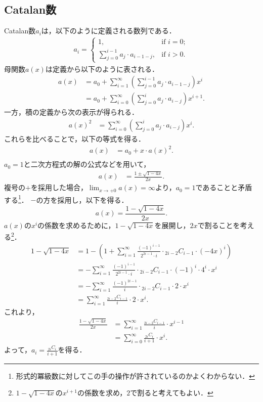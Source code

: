 \documentclass{jsarticle}
\begin{document}
\subsection{Catalan数}
Catalan数$a_i$は，以下のように定義される数列である．
\begin{align*}
  a_i = \begin{cases}
    1, & \text{if }i = 0;\\
    \displaystyle\sum_{j=0}^{i-1} a_j\cdot a_{i-1-j}, & \text{if }i > 0.
  \end{cases}
\end{align*}
母関数$a(x)$は定義から以下のように表される．
\begin{align*}
  a(x)
  &= a_0 + \sum_{i=1}^\infty \left(\sum_{j=0}^{i-1} a_j\cdot a_{i-1-j}\right) x^i\\
  &= a_0 + \sum_{i=0}^\infty \left(\sum_{j=0}^i a_j\cdot a_{i-j}\right) x^{i+1}.
\end{align*}
一方，積の定義から次の表示が得られる．
\begin{align*}
  a(x)^2
  &= \sum_{i=0}^\infty \left(\sum_{j=0}^i a_j\cdot a_{i-j}\right) x^i.
\end{align*}
これらを比べることで，以下の等式を得る．
\begin{align*}
  a(x) &= a_0 + x\cdot a(x)^2.\\
\end{align*}
$a_0 = 1$と二次方程式の解の公式などを用いて，
\begin{align*}
  a(x) &= \frac{1\pm\sqrt{1-4x}}{2x}.
\end{align*}
複号の$+$を採用した場合，$\lim_{x\to+0}a(x)=\infty$より，$a_0=1$であることと矛盾する\footnote{形式的冪級数に対してこの手の操作が許されているのかよくわからない．}．
$-$の方を採用し，以下を得る．
\[a(x) = \frac{1-\sqrt{1-4x}}{2x}.\]
$a(x)$の$x^i$の係数を求めるために，$1-\sqrt{1-4x}$を展開し，$2x$で割ることを考える\footnote{$1-\sqrt{1-4x}$の$x^{i+1}$の係数を求め，$2$で割ると考えてもよい．}．
\begin{align*}
  1-\sqrt{1-4x}
  &= 1 - \left(1 + \sum_{i=1}^\infty \frac{(-1)^{i-1}}{2^{2i-1}\cdot i}\cdot {}_{2i-2}C_{i-1}\cdot (-4x)^i\right)\\
  &= -\sum_{i=1}^\infty \frac{(-1)^{i-1}}{2^{2i-1}\cdot i}\cdot {}_{2i-2}C_{i-1}\cdot (-1)^i\cdot 4^i\cdot x^i\\
  &= -\sum_{i=1}^\infty \frac{(-1)^{2i-1}}{i}\cdot {}_{2i-2}C_{i-1}\cdot 2\cdot x^i\\
  &= \sum_{i=1}^\infty \frac{{}_{2i-2}C_{i-1}}{i}\cdot 2\cdot x^i.
\end{align*}
これより，
\begin{align*}
  \frac{1-\sqrt{1-4x}}{2x} &= \sum_{i=1}^\infty \frac{{}_{2i-2}C_{i-1}}{i}\cdot x^{i-1}\\
  &= \sum_{i=0}^\infty \frac{{}_{2i}C_{i}}{i+1}\cdot x^i.
\end{align*}
よって，$\displaystyle a_i = \frac{{}_{2i}C_i}{i+1}$を得る．
\end{document}
